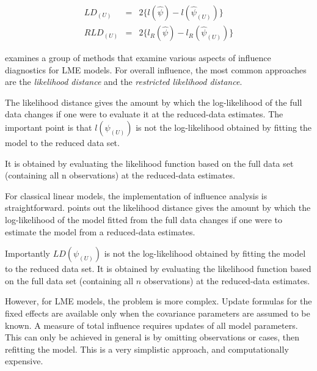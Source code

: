 \documentclass[12pt, a4paper]{report}
\theoremstyle{plain}
\theoremstyle{definition}
\theoremstyle{remark}
\begin{document}
\begin{eqnarray}
LD_{(U)} &=& 2\{l(\hat{\psi}) - l( \hat{\psi}_{(U)}) \}\\
RLD_{(U)} &=& 2\{l_{R}(\hat{\psi}) - l_{R}(\hat{\psi}_{(U)})\}
\end{eqnarray}

\citet{west} examines a group of methods that examine various aspects of influence diagnostics for LME models.
For overall influence, the most common approaches are the \textit{likelihood distance} and the \textit{restricted likelihood distance}.


The likelihood distance gives the amount by which the log-likelihood of the full data changes if one were to evaluate it at the reduced-data estimates. The important point is that $l(\psi_{(U)})$ is not the log-likelihood obtained by fitting the model to the reduced data set.

It is obtained by evaluating the likelihood function based on the full data set (containing all n observations) at the reduced-data estimates.



For classical linear models, the implementation of influence analysis is straightforward. \citet{schab} points out the likelihood distance gives the amount by which the log-likelihood of the model fitted from the full data changes if one were to estimate the model from a reduced-data estimates. 

Importantly $LD(\psi_{(U)})$ is not the log-likelihood obtained by fitting the model to the reduced data set. It is obtained by evaluating the likelihood function based on the full data set (containing all $n$ observations) at the reduced-data estimates.


However, for LME models, the problem is more complex. Update formulas for the fixed effects are available only when the covariance parameters are assumed to be known. A measure of total influence requires updates of all model parameters. This can only be achieved in general is by omitting observations or cases, then refitting the model. This is a very simplistic approach, and computationally expensive.



\end{document}
